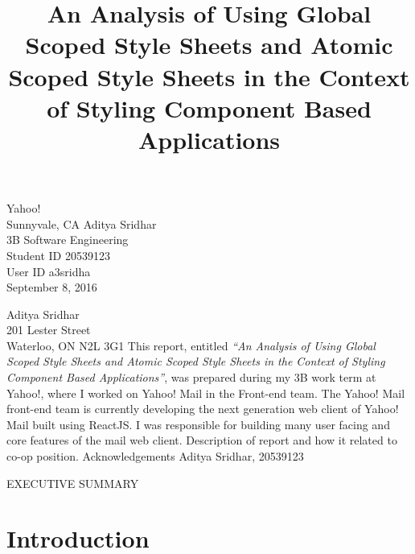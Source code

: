 \documentclass[12pt]{article}
\begin{document}


\title{An Analysis of Using Global Scoped Style Sheets and Atomic Scoped Style Sheets in the Context of Styling Component Based Applications}
{
	Yahoo!\\
	Sunnyvale, CA
}
{
	Aditya Sridhar\\
	3B Software Engineering\\
	Student ID 20539123\\
	User ID a3sridha\\
	September 8, 2016
}


{
	\noindent
	Aditya Sridhar\\
	201 Lester Street\\
	Waterloo, ON N2L 3G1
}
{
	This report, entitled \textit{“An Analysis of Using Global Scoped Style Sheets and Atomic Scoped Style Sheets in the Context of Styling Component Based Applications”}, was prepared during my 3B work term at Yahoo!, where I worked on Yahoo! Mail in the Front-end team.
}
{
	The Yahoo! Mail front-end team is currently developing the next generation web client of Yahoo! Mail built using ReactJS. I was responsible for building many user facing and core features of the mail web client.
}
{
	Description of report and how it related to co-op position.
}
{
	Acknowledgements
}
{
	Aditya Sridhar, 20539123
}


EXECUTIVE SUMMARY
\newpage




\toc
\lof
\lot

\section{Introduction}
\end{document}
